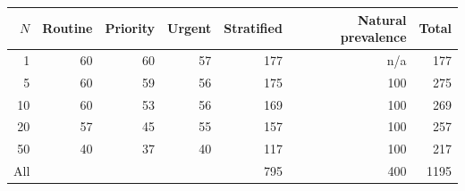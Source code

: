\begin{tabular}{rrrrrrr}
\toprule
$N$ & Routine & Priority & Urgent & Stratified & Natural prevalence & Total \\
\midrule
1 & 60 & 60 & 57 & 177 & n/a & 177 \\
5 & 60 & 59 & 56 & 175 & 100 & 275 \\
10 & 60 & 53 & 56 & 169 & 100 & 269 \\
20 & 57 & 45 & 55 & 157 & 100 & 257 \\
50 & 40 & 37 & 40 & 117 & 100 & 217 \\
All &  &  &  & 795 & 400 & 1195 \\
\bottomrule
\end{tabular}
